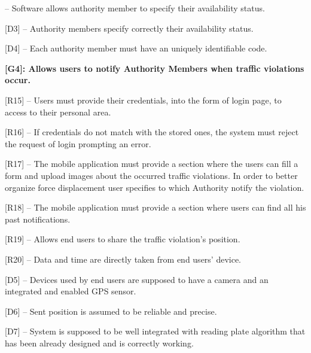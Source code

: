 \documentclass[12pt]{article}
\begin{document}
\begin{flushleft}
[R14] – Software allows authority member to specify their availability status.
\vspace{2mm}

[D3] -- Authority members specify correctly their availability status.
\vspace{2mm}

[D4] -- Each authority member must have an uniquely identifiable code. 
\vspace{2mm}

\vspace{4mm}
\textbf{[G4]: Allows users to notify Authority Members when traffic violations occur.}
\vspace{2mm}

[R15] -- Users must provide their credentials, into the form of login page, to access to their personal area.
\vspace{2mm}

[R16] – If credentials do not match with the stored ones, the system must reject the request of login prompting an error.
\vspace{2mm}

[R17] – The mobile application must provide a section where the users can fill a form and upload images about the occurred traffic violations. In order to better organize force displacement user specifies to which Authority notify the violation.
\vspace{2mm}

[R18] –  The mobile application must provide a section where users can find all his past notifications.
\vspace{2mm}

[R19] – Allows end users to share the traffic violation’s position.
\vspace{2mm}

[R20] – Data and time are directly taken from end users’ device.
\vspace{2mm}

[D5] -- Devices used by end users are supposed to have a camera and an integrated and enabled GPS sensor.
\vspace{2mm}

[D6] -- Sent position is assumed to be reliable and precise.
\vspace{2mm}

[D7] -- System is supposed to be well integrated with reading plate algorithm that has been already designed and is correctly working.
\vspace{2mm}


\end{flushleft}
\end{document}
